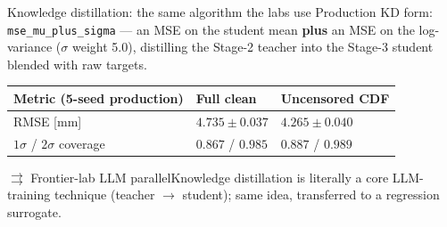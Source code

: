 \documentclass[aspectratio=169,11pt]{beamer}
\newcommand{\good}[1]{\textcolor{goodGreen}{#1}}
\newcommand{\llmparallel}[1]{%
  \begin{block}{$\rightrightarrows$ Frontier-lab LLM parallel}#1\end{block}}
\begin{document}
\begin{frame}{Knowledge distillation: the same algorithm the labs use}
\small
Production KD form: \texttt{mse\_mu\_plus\_sigma} --- an MSE on the student mean
\textbf{plus} an MSE on the log-variance (\(\sigma\) weight \num{5.0}), distilling
the Stage-2 teacher into the Stage-3 student blended with raw targets.

\vspace{0.4em}
\begin{center}
\footnotesize
\renewcommand{\arraystretch}{1.1}
\begin{tabular}{@{}L{4.4cm}R{2.6cm}R{2.6cm}@{}}
\toprule
\textbf{Metric (5-seed production)} & \textbf{Full clean} & \textbf{Uncensored CDF} \\
\midrule
RMSE [mm] & \good{$4.735\pm0.037$} & \good{$4.265\pm0.040$} \\
$1\sigma$ / $2\sigma$ coverage & $0.867$ / $0.985$ & $0.887$ / $0.989$ \\
\bottomrule
\end{tabular}
\end{center}

\vspace{0.4em}
\llmparallel{Knowledge distillation is literally a core LLM-training technique
(teacher $\to$ student); same idea, transferred to a regression surrogate.}
\end{frame}
\end{document}
